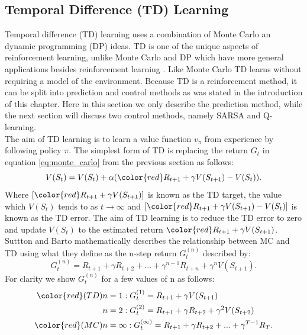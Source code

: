 \subsection{Temporal Difference (TD) Learning}
Temporal difference (TD) learning uses a combination of Monte Carlo an dynamic programming (DP) ideas. TD is one of the unique aspects of reinforcement learning, unlike Monte Carlo and DP which have more general applications besides reinforcement learning \cite{sutton_barto}. Like Monte Carlo TD learns without requiring a model of the environment. Because TD is a reinforcement method, it can be split into prediction and control methods as was stated in the introduction of this chapter. Here in this section we only describe the prediction method, while the next section will discuss two control methods, namely SARSA and Q-learning.\\
The aim of TD learning is to learn a value function $v_\pi$ from experience by following policy $\pi$. 
The simplest form of TD is replacing the return $G_t$ in equation \ref{eq:monte_carlo} from the previous section as follows:
\begin{equation}
	V(S_t) = V(S_t) + \alpha({\color{red}R_{t+1} +  \gamma V(S_{t+1})} - V(S_t)).
	\label{eq:monte_carlo_TD}
\end{equation}
Where $[{\color{red}R_{t+1} +  \gamma V(S_{t+1})}]$ is known as the TD target, the value which $V(S_t)$ tends to as $t \to \infty$ and
$[{\color{red}R_{t+1} +  \gamma V(S_{t+1})} - V(S_t)]$ is known as the TD error. The aim of TD learning is to reduce the TD error to zero and update $V(S_t)$ to the estimated return ${\color{red}R_{t+1} +  \gamma V(S_{t+1})}$.
Suttton and Barto mathematically describes the relationship between MC and TD using what they define as the n-step return $G_{t}^{(n)}$ described by:
\begin{equation}
	G_{t}^{(n)} = R_{t+1} + \gamma R_{t+2} + ... + \gamma^{n-1}R_{t+n} + \gamma^{n}V(S_{t+1}).
\end{equation}
For clarity we show 
$G_{t}^{(n)}$ for a few values of n as follows:\\
\begin{align}
	 {\color{red}(TD)} n &= 1: G_{t}^{(1)} = R_{t+1}+\gamma V(S_{t+1}) \label{eq:td} \\
	n &= 2 : G_{t}^{(2)} = R_{t+1}+ \gamma R_{t+2}+\gamma^2 V(S_{t+2}) \\
	{\color{red}(MC)} n &= \infty : G_{t}^{(\infty)} = R_{t+1}+ \gamma R_{t+2}+...+\gamma^{T-1} R_T. \label{eq:mc_td}
\end{align}
